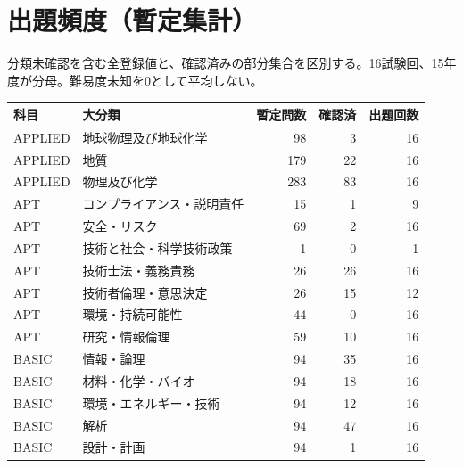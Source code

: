 \chapter{出題頻度（暫定集計）}
分類未確認を含む全登録値と、確認済みの部分集合を区別する。16試験回、15年度が分母。難易度未知を0として平均しない。
\begin{longtable}{p{.16\linewidth}p{.42\linewidth}rrr}
科目 & 大分類 & 暫定問数 & 確認済 & 出題回数\\\hline
APPLIED & 地球物理及び地球化学 & 98 & 3 & 16\\
APPLIED & 地質 & 179 & 22 & 16\\
APPLIED & 物理及び化学 & 283 & 83 & 16\\
APT & コンプライアンス・説明責任 & 15 & 1 & 9\\
APT & 安全・リスク & 69 & 2 & 16\\
APT & 技術と社会・科学技術政策 & 1 & 0 & 1\\
APT & 技術士法・義務責務 & 26 & 26 & 16\\
APT & 技術者倫理・意思決定 & 26 & 15 & 12\\
APT & 環境・持続可能性 & 44 & 0 & 16\\
APT & 研究・情報倫理 & 59 & 10 & 16\\
BASIC & 情報・論理 & 94 & 35 & 16\\
BASIC & 材料・化学・バイオ & 94 & 18 & 16\\
BASIC & 環境・エネルギー・技術 & 94 & 12 & 16\\
BASIC & 解析 & 94 & 47 & 16\\
BASIC & 設計・計画 & 94 & 1 & 16\\
\end{longtable}
